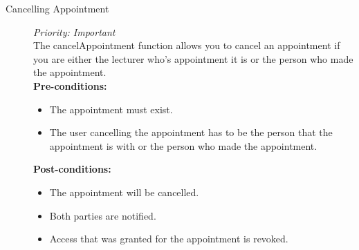 \begin{description}

\item[Cancelling Appointment]\hfill \textit{Priority: Important} \\
The cancelAppointment function allows you to cancel an appointment if you are either the lecturer who's appointment it is or the person who made the appointment.  \\
\textbf{Pre-conditions:} 
	\begin{itemize}
		\item The appointment must exist.
		\item The user cancelling the appointment has to be the person that the appointment is with or the person who made the appointment.
	\end{itemize}
\textbf{Post-conditions:}
	\begin{itemize}
		\item The appointment will be cancelled.
		\item  Both parties are notified.
		\item Access that was granted for the appointment is revoked. 
	\end{itemize}


\end{description}